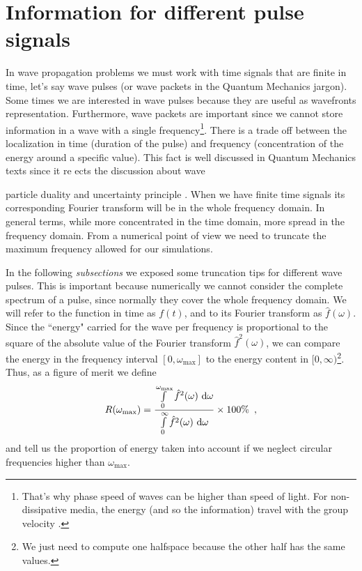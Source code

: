 \documentclass[12pt,letterpaper]{article}
\begin{document}
\section{Information for different pulse signals}
In wave propagation problems we must work with time signals that are finite in time, let's say wave pulses (or wave packets in the Quantum Mechanics jargon). Some times we are interested in wave pulses because they are useful as wavefronts representation. Furthermore, wave packets are important since we cannot store information in a wave with a single frequency\footnote{That's why phase speed of waves can be higher than speed of light. For non-dissipative media, the energy (and so the information) travel with the group velocity \cite{book:Brillouin1}.}. There is a trade off between the localization in time (duration of the pulse) and frequency (concentration of the energy around a specific value). This fact is well discussed in Quantum Mechanics texts since it re ects the discussion about wave{particle duality and uncertainty principle \cite{book:Zetilli}. When we have finite time signals its corresponding Fourier transform will be in the whole frequency domain. In general terms, while more concentrated in the time domain, more spread in the frequency domain. From a numerical point of view we need to truncate the maximum frequency allowed for our simulations.

In the following \emph{subsections} we exposed some truncation tips for different wave pulses. This is important because numerically we cannot consider the complete spectrum of a pulse, since normally they cover the whole frequency domain. We will refer to the function in time as $f(t)$, and to its Fourier transform as $\hat{f}(\omega)$. Since the ``energy" carried for the wave per frequency is proportional to the square of the absolute value of the Fourier transform $\hat{f}^2(\omega)$, we can compare the energy in the frequency interval $[0,\omega_{\max}]$ to the energy content in $[0,\infty)$\footnote{We just need to compute one halfspace because the other half has the same values.}. Thus, as a figure of merit we define
\begin{equation}
R(\omega_{\max}) = \frac{\int\limits_{0}^{\omega_{\max}} \hat{f}^2 (\omega)\ \rm{d}\omega}{\int\limits_{0}^{\infty} \hat{f}^2 (\omega)\ \rm{d}\omega}\times 100\% \enspace ,
\label{eq:trunc_energy}
\end{equation}
and tell us the proportion of energy taken into account if we neglect circular frequencies higher than $\omega_{\max}$.

}
\end{document}
